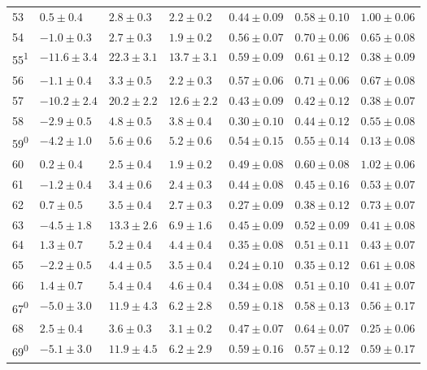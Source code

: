 \begin{tabular}{l l l l l l l}
53 & $0.5 \pm 0.4$ & $2.8 \pm 0.3$ & $2.2 \pm 0.2$ & $0.44 \pm 0.09$ & $0.58 \pm 0.10$ & $1.00 \pm 0.06$ \\ 
54 & $-1.0 \pm 0.3$ & $2.7 \pm 0.3$ & $1.9 \pm 0.2$ & $0.56 \pm 0.07$ & $0.70 \pm 0.06$ & $0.65 \pm 0.08$ \\ 
55\textsuperscript{1} & $-11.6 \pm 3.4$ & $22.3 \pm 3.1$ & $13.7 \pm 3.1$ & $0.59 \pm 0.09$ & $0.61 \pm 0.12$ & $0.38 \pm 0.09$ \\ 
56 & $-1.1 \pm 0.4$ & $3.3 \pm 0.5$ & $2.2 \pm 0.3$ & $0.57 \pm 0.06$ & $0.71 \pm 0.06$ & $0.67 \pm 0.08$ \\ 
57 & $-10.2 \pm 2.4$ & $20.2 \pm 2.2$ & $12.6 \pm 2.2$ & $0.43 \pm 0.09$ & $0.42 \pm 0.12$ & $0.38 \pm 0.07$ \\ 
58 & $-2.9 \pm 0.5$ & $4.8 \pm 0.5$ & $3.8 \pm 0.4$ & $0.30 \pm 0.10$ & $0.44 \pm 0.12$ & $0.55 \pm 0.08$ \\ 
59\textsuperscript{0} & $-4.2 \pm 1.0$ & $5.6 \pm 0.6$ & $5.2 \pm 0.6$ & $0.54 \pm 0.15$ & $0.55 \pm 0.14$ & $0.13 \pm 0.08$ \\ 
60 & $0.2 \pm 0.4$ & $2.5 \pm 0.4$ & $1.9 \pm 0.2$ & $0.49 \pm 0.08$ & $0.60 \pm 0.08$ & $1.02 \pm 0.06$ \\ 
61 & $-1.2 \pm 0.4$ & $3.4 \pm 0.6$ & $2.4 \pm 0.3$ & $0.44 \pm 0.08$ & $0.45 \pm 0.16$ & $0.53 \pm 0.07$ \\ 
62 & $0.7 \pm 0.5$ & $3.5 \pm 0.4$ & $2.7 \pm 0.3$ & $0.27 \pm 0.09$ & $0.38 \pm 0.12$ & $0.73 \pm 0.07$ \\ 
63 & $-4.5 \pm 1.8$ & $13.3 \pm 2.6$ & $6.9 \pm 1.6$ & $0.45 \pm 0.09$ & $0.52 \pm 0.09$ & $0.41 \pm 0.08$ \\ 
64 & $1.3 \pm 0.7$ & $5.2 \pm 0.4$ & $4.4 \pm 0.4$ & $0.35 \pm 0.08$ & $0.51 \pm 0.11$ & $0.43 \pm 0.07$ \\ 
65 & $-2.2 \pm 0.5$ & $4.4 \pm 0.5$ & $3.5 \pm 0.4$ & $0.24 \pm 0.10$ & $0.35 \pm 0.12$ & $0.61 \pm 0.08$ \\ 
66 & $1.4 \pm 0.7$ & $5.4 \pm 0.4$ & $4.6 \pm 0.4$ & $0.34 \pm 0.08$ & $0.51 \pm 0.10$ & $0.41 \pm 0.07$ \\ 
67\textsuperscript{0} & $-5.0 \pm 3.0$ & $11.9 \pm 4.3$ & $6.2 \pm 2.8$ & $0.59 \pm 0.18$ & $0.58 \pm 0.13$ & $0.56 \pm 0.17$ \\ 
68 & $2.5 \pm 0.4$ & $3.6 \pm 0.3$ & $3.1 \pm 0.2$ & $0.47 \pm 0.07$ & $0.64 \pm 0.07$ & $0.25 \pm 0.06$ \\ 
69\textsuperscript{0} & $-5.1 \pm 3.0$ & $11.9 \pm 4.5$ & $6.2 \pm 2.9$ & $0.59 \pm 0.16$ & $0.57 \pm 0.12$ & $0.59 \pm 0.17$ \\ 

\end{tabular}
